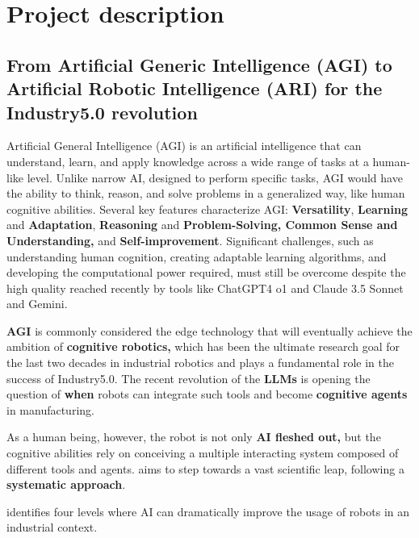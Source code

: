 \section{\texorpdfstring{Project description}{Project description }}\label{project-description}

\subsection{From Artificial Generic Intelligence (AGI) to Artificial
Robotic Intelligence (ARI) for the Industry5.0
revolution}\label{from-artificial-generic-intelligence-agi-to-artificial-robotic-intelligence-ari-for-the-industry5.0-revolution}

Artificial General Intelligence (AGI) is an artificial intelligence that
can understand, learn, and apply knowledge across a wide range of tasks
at a human-like level. Unlike narrow AI, designed to perform specific
tasks, AGI would have the ability to think, reason, and solve problems
in a generalized way, like human cognitive abilities. Several key
features characterize AGI: \textbf{Versatility}, \textbf{Learning} and
\textbf{Adaptation}, \textbf{Reasoning} and \textbf{Problem-Solving,
Common Sense and Understanding,} and \textbf{Self-improvement}.
Significant challenges, such as understanding human cognition, creating
adaptable learning algorithms, and developing the computational power
required, must still be overcome despite the high quality reached
recently by tools like ChatGPT4 o1 and Claude 3.5 Sonnet and Gemini.

\textbf{AGI} is commonly considered the edge technology that will
eventually achieve the ambition of \textbf{cognitive robotics,} which
has been the ultimate research goal for the last two decades in
industrial robotics and plays a fundamental role in the success of
Industry5.0. The recent revolution of the \textbf{LLMs} is opening the
question of \textbf{when} robots can integrate such tools and become
\textbf{cognitive agents} in manufacturing.

As a human being, however, the robot is not only \textbf{AI fleshed
out,} but the cognitive abilities rely on conceiving a multiple
interacting system composed of different tools and agents.
 aims to step towards a vast scientific leap, following
a \textbf{systematic approach}.

 identifies four levels where AI can dramatically
improve the usage of robots in an industrial context.


